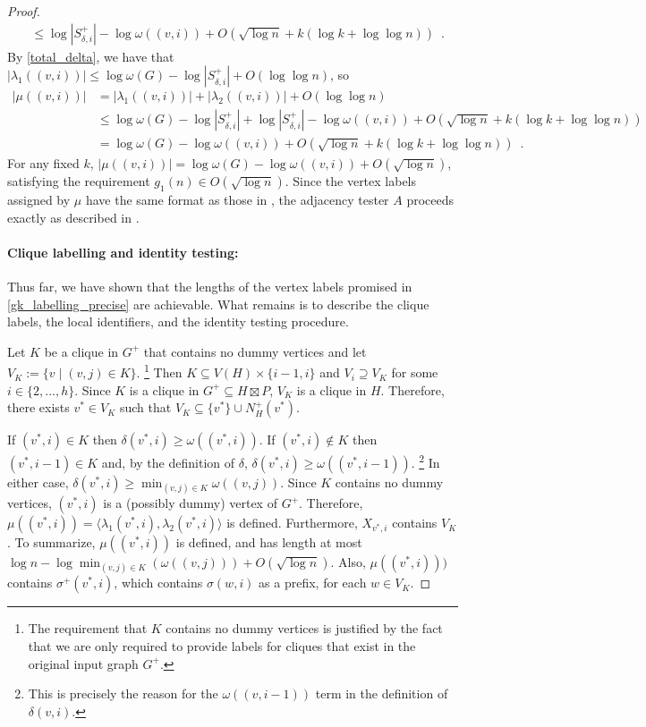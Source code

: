 \documentclass{patmorin}
\let\eqref\cref
\renewcommand{\ge}{\geqslant}
\renewcommand{\le}{\leqslant}
\newcommand{\Oh}{O}
\begin{document}
\begin{proof}
\begin{align*}
       & \le \log |S^+_{\delta,i}|-\log \omega((v,i)) + \Oh(\sqrt{\log n} + k(\log k+\log\log n)) \enspace .
    \end{align*}
    By \eqref{total_delta}, we have that $|\lambda_1((v,i))|\le \log\omega(G) - \log |S^+_{\delta,i}| + \Oh(\log\log n)$, so
    \begin{align*}
      |\mu((v,i))|
       & = |\lambda_1((v,i))|+|\lambda_2((v,i))| + \Oh(\log\log n)                                                                        \\
       & \le \log\omega(G) - \log |S^+_{\delta,i}| + \log |S^+_{\delta,i}|-\log \omega((v,i)) + \Oh(\sqrt{\log n} + k(\log k+\log\log n)) \\
       & = \log\omega(G) - \log\omega((v,i)) + \Oh(\sqrt{\log n} + k(\log k+\log\log n)) \enspace .
    \end{align*}
    For any fixed $k$, $|\mu((v,i))|=\log \omega(G)-\log \omega((v,i)) + \Oh(\sqrt{\log n})$, satisfying the requirement $g_1(n)\in\Oh(\sqrt{\log n})$. Since the vertex labels assigned by $\mu$ have the same format as those in \cite{alstrup.dahlgaard.ea:optimal,dujmovic.esperet.ea:adjacency}, the adjacency tester $A$ proceeds exactly as described in \cite{alstrup.rauhe:improved,dujmovic.esperet.ea:adjacency}.

    \paragraph{Clique labelling and identity testing:}
    Thus far, we have shown that the lengths of the vertex labels promised in \cref{gk_labelling_precise} are achievable. 
    What remains is to describe the clique labels, the local identifiers, and the identity testing procedure.

    Let $K$ be a clique in $G^+$ that contains no dummy vertices and let $V_K:=\{v\mid (v,j)\in K\}$.%
    \footnote{The requirement that $K$ contains no dummy vertices is justified by the fact that we are only required to provide labels for cliques that exist in the original input graph $G^+$.}
    Then $K\subseteq V(H)\times\{i-1,i\}$  and $V_i\supseteq V_K$ for some $i\in\{2,\ldots,h\}$.  Since $K$ is a clique in $G^+\subseteq H\boxtimes P$, $V_K$ is a clique in $H$.  Therefore, there exists $v^*\in V_K$ such that $V_K\subseteq \{v^*\}\cup N^+_H(v^*)$.

    If $(v^*,i)\in K$ then $\delta(v^*,i)\ge \omega((v^*,i))$. If $(v^*,i)\not\in K$ then $(v^*,i-1)\in K$ and, by the definition of $\delta$, $\delta(v^*,i)\ge \omega((v^*,i-1))$.%
    \footnote{This is precisely the reason for the $\omega((v,i-1))$ term in the definition of $\delta(v,i)$.}
    In either case, $\delta(v^*,i)\ge\min_{(v,j)\in K}\omega((v,j))$.  Since $K$ contains no dummy vertices, $(v^*,i)$ is a (possibly dummy) vertex of $G^+$.  Therefore, $\mu((v^*,i))=\langle \lambda_1(v^*,i),\lambda_2(v^*,i)\rangle$ is defined.  Furthermore, $X_{v^*,i}$ contains $V_K$.  To summarize, $\mu((v^*,i))$ is defined, and has length at most $\log n - \log\min_{(v,j)\in K}(\omega((v,j))) + \Oh(\sqrt{\log n})$.  Also, $\mu((v^*,i)))$ contains $\sigma^+(v^*,i)$, which contains $\sigma(w,i)$ as a prefix, for each $w\in V_K$.


\end{proof}
\end{document}

